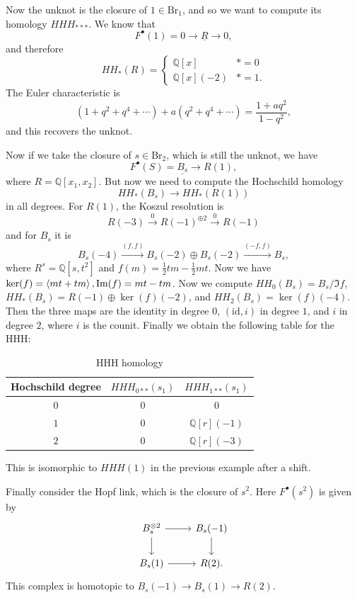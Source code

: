 \documentclass[leqno, openany]{memoir}
\theoremstyle{definition}
\theoremstyle{remark}
\theoremstyle{plain}
\theoremstyle{definition}
\theoremstyle{remark}
\newcommand{\Q}{\mathbb{Q}}
\newcommand{\mr}[1]{\mathrm{#1}}
\newcommand{\ul}[1]{\underline{#1}}
\begin{document}
Now the unknot is the closure of $1 \in \mr{Br}_1$, and so we want to compute its homology $HHH_{***}$. We know that
\[ F^{\bullet}(1) = 0 \to \ul{R} \to 0, \]
and therefore
\[ HH_*(R) = \begin{cases}
    \Q[x] & * = 0 \\ 
    \Q[x](-2) & * = 1.
\end{cases}
\]
The Euler characteristic is
\[ (1 + q^2 + q^4 + \cdots) + a (q^2 + q^4 + \cdots) = \frac{1+aq^2}{1-q^2}, \]
and this recovers the unknot.

Now if we take the closure of $s \in \mr{Br}_2$, which is still the unknot, we have
\[ F^{\bullet}(S) = \ul{B_s} \to R(1) ,\]
where $R = \Q[x_1, x_2]$. But now we need to compute the Hochschild homology
\[ HH_*(B_s) \to HH_*(R(1)) \]
in all degrees. For $R(1)$, the Koszul resolution is
\[ R(-3) \xrightarrow{0} { R(-1) }^{\oplus 2} \xrightarrow{0} R(-1) \]
and for $B_s$ it is
\[ B_s(-4) \xrightarrow{(f,f)} B_s(-2) \oplus B_s(-2) \xrightarrow{(-f,f)} B_s, \]
where $R^s = \Q[s,t^2]$ and $f(m) = \frac{1}{2} tm - \frac{1}{2} mt$. Now we have $\ker(f) = \ev{mt+tm}, \Im(f) = mt-tm$. Now we compute $HH_0(B_s) = B_s/\Im f$, $HH_*(B_s) = R(-1) \oplus \ker(f)(-2)$, and $HH_2(B_s) = \ker(f)(-4)$. Then the three maps are the identity in degree $0$, $(\mr{id}, i)$ in degree $1$, and $i$ in degree $2$, where $i$ is the counit. Finally we obtain the following table for the HHH:
\begin{table}[H]
    \centering
    \caption{HHH homology}
    \label{tab:label}
    \begin{tabular}{ccc}
    \toprule
    Hochschild degree & $HHH_{0**}(s_1)$ & $HHH_{1**}(s_1)$ \\
    \midrule
        $0$ & $0$ & $0$ \\
        $1$ & $0$ & $\Q[r](-1)$ \\
        $2$ & $0$ & $\Q[r](-3)$
    \end{tabular}
\end{table}

This is isomorphic to $HHH(1)$ in the previous example after a shift.

Finally consider the Hopf link, which is the closure of $s^2$. Here $F^{\bullet}(s^2)$ is given by
\begin{equation*}
\begin{tikzcd}
    B_s^{\otimes 2} \ar{r} \ar{d} & B_s(-1) \ar{d} \\
    B_s(1) \ar{r} & R(2).
\end{tikzcd}
\end{equation*}
This complex is homotopic to $B_s(-1) \to B_s(1) \to R(2)$.
\end{document}
